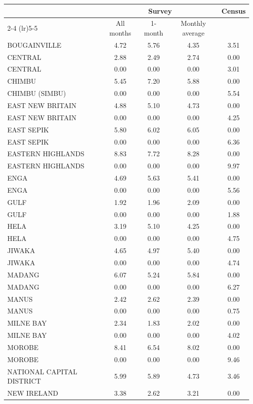 \begin{tabular}{lcccc} \toprule & \multicolumn{3}{c}{Survey} & Census \\ \cmidrule(lr){2-4} \cmidrule(lr){5-5} & All months & 1-month & Monthly average &  \\  \midrule 
BOUGAINVILLE & 4.72 & 5.76 & 4.35 & 3.51 \\
CENTRAL & 2.88 & 2.49 & 2.74 & 0.00 \\
CENTRAL & 0.00 & 0.00 & 0.00 & 3.01 \\
CHIMBU & 5.45 & 7.20 & 5.88 & 0.00 \\
CHIMBU (SIMBU) & 0.00 & 0.00 & 0.00 & 5.54 \\
EAST NEW BRITAIN & 4.88 & 5.10 & 4.73 & 0.00 \\
EAST NEW BRITAIN & 0.00 & 0.00 & 0.00 & 4.25 \\
EAST SEPIK & 5.80 & 6.02 & 6.05 & 0.00 \\
EAST SEPIK & 0.00 & 0.00 & 0.00 & 6.36 \\
EASTERN HIGHLANDS & 8.83 & 7.72 & 8.28 & 0.00 \\
EASTERN HIGHLANDS & 0.00 & 0.00 & 0.00 & 9.97 \\
ENGA & 4.69 & 5.63 & 5.41 & 0.00 \\
ENGA & 0.00 & 0.00 & 0.00 & 5.56 \\
GULF & 1.92 & 1.96 & 2.09 & 0.00 \\
GULF & 0.00 & 0.00 & 0.00 & 1.88 \\
HELA & 3.19 & 5.10 & 4.25 & 0.00 \\
HELA & 0.00 & 0.00 & 0.00 & 4.75 \\
JIWAKA & 4.65 & 4.97 & 5.40 & 0.00 \\
JIWAKA & 0.00 & 0.00 & 0.00 & 4.74 \\
MADANG & 6.07 & 5.24 & 5.84 & 0.00 \\
MADANG & 0.00 & 0.00 & 0.00 & 6.27 \\
MANUS & 2.42 & 2.62 & 2.39 & 0.00 \\
MANUS & 0.00 & 0.00 & 0.00 & 0.75 \\
MILNE BAY & 2.34 & 1.83 & 2.02 & 0.00 \\
MILNE BAY & 0.00 & 0.00 & 0.00 & 4.02 \\
MOROBE & 8.41 & 6.54 & 8.02 & 0.00 \\
MOROBE & 0.00 & 0.00 & 0.00 & 9.46 \\
NATIONAL CAPITAL DISTRICT & 5.99 & 5.89 & 4.73 & 3.46 \\
NEW IRELAND & 3.38 & 2.62 & 3.21 & 0.00 \\

\end{tabular}
